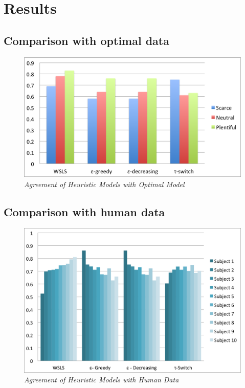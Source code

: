 \section{Results}
\label{results}

\subsection{Comparison with optimal data}

\begin{figure}[H]
\begin{center}
\includegraphics[scale=0.5]{optimalVsHeuristicNoTitle}
\caption{\small \sl \label{plot} Agreement of Heuristic Models with Optimal Model}
\end{center}
\end{figure}

\subsection{Comparison with human data}
\begin{figure}[H]
\begin{center}
\includegraphics[scale=0.5]{humanVsHeuristicNoTitle}
\caption{\small \sl \label{plot} Agreement of Heuristic Models with Human Data}
\end{center}
\end{figure}